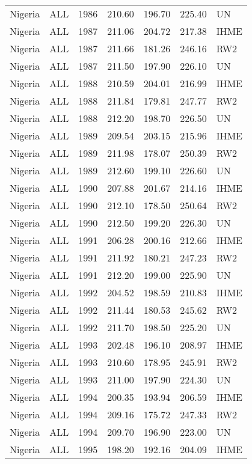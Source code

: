 \begin{longtable}{lllrrrl}
  Nigeria & ALL & 1986 & 210.60 & 196.70 & 225.40 & UN \\ 
  Nigeria & ALL & 1987 & 211.06 & 204.72 & 217.38 & IHME \\ 
  Nigeria & ALL & 1987 & 211.66 & 181.26 & 246.16 & RW2 \\ 
  Nigeria & ALL & 1987 & 211.50 & 197.90 & 226.10 & UN \\ 
  Nigeria & ALL & 1988 & 210.59 & 204.01 & 216.99 & IHME \\ 
  Nigeria & ALL & 1988 & 211.84 & 179.81 & 247.77 & RW2 \\ 
  Nigeria & ALL & 1988 & 212.20 & 198.70 & 226.50 & UN \\ 
  Nigeria & ALL & 1989 & 209.54 & 203.15 & 215.96 & IHME \\ 
  Nigeria & ALL & 1989 & 211.98 & 178.07 & 250.39 & RW2 \\ 
  Nigeria & ALL & 1989 & 212.60 & 199.10 & 226.60 & UN \\ 
  Nigeria & ALL & 1990 & 207.88 & 201.67 & 214.16 & IHME \\ 
  Nigeria & ALL & 1990 & 212.10 & 178.50 & 250.64 & RW2 \\ 
  Nigeria & ALL & 1990 & 212.50 & 199.20 & 226.30 & UN \\ 
  Nigeria & ALL & 1991 & 206.28 & 200.16 & 212.66 & IHME \\ 
  Nigeria & ALL & 1991 & 211.92 & 180.21 & 247.23 & RW2 \\ 
  Nigeria & ALL & 1991 & 212.20 & 199.00 & 225.90 & UN \\ 
  Nigeria & ALL & 1992 & 204.52 & 198.59 & 210.83 & IHME \\ 
  Nigeria & ALL & 1992 & 211.44 & 180.53 & 245.62 & RW2 \\ 
  Nigeria & ALL & 1992 & 211.70 & 198.50 & 225.20 & UN \\ 
  Nigeria & ALL & 1993 & 202.48 & 196.10 & 208.97 & IHME \\ 
  Nigeria & ALL & 1993 & 210.60 & 178.95 & 245.91 & RW2 \\ 
  Nigeria & ALL & 1993 & 211.00 & 197.90 & 224.30 & UN \\ 
  Nigeria & ALL & 1994 & 200.35 & 193.94 & 206.59 & IHME \\ 
  Nigeria & ALL & 1994 & 209.16 & 175.72 & 247.33 & RW2 \\ 
  Nigeria & ALL & 1994 & 209.70 & 196.90 & 223.00 & UN \\ 
  Nigeria & ALL & 1995 & 198.20 & 192.16 & 204.09 & IHME \\ 

\end{longtable}
